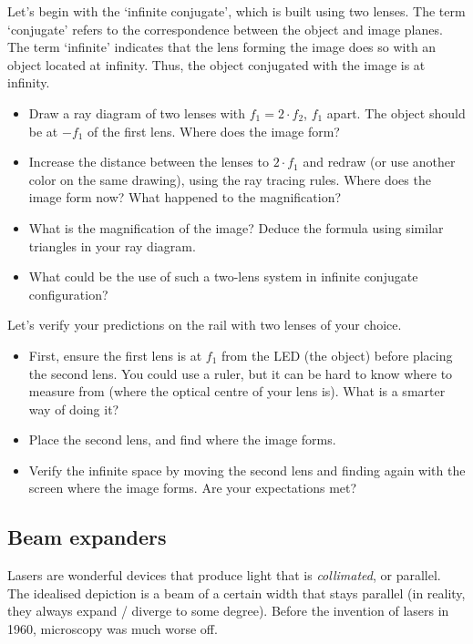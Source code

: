 \documentclass[a4paper]{report}
\begin{document}
	Let's begin with the `infinite conjugate', which is built using two lenses.
	The term `conjugate' refers to the correspondence between the object and image planes.
	The term `infinite' indicates that the lens forming the image does so with an object located at infinity.
	Thus, the object conjugated with the image is at infinity.

	\begin{itemize}
		\item Draw a ray diagram of two lenses with $f_1=2 \cdot f_2$, $f_1$ apart. The object should be at $-f_1$ of the first lens. Where does the image form?
		\item Increase the distance between the lenses to $2\cdot f_1$ and redraw (or use another color on the same drawing), using the ray tracing rules. Where does the image form now? What happened to the magnification?
		\item What is the magnification of the image? Deduce the formula using similar triangles in your ray diagram.
		\item What could be the use of such a two-lens system in infinite conjugate configuration?
	\end{itemize}

    \noindent
	Let's verify your predictions on the rail with two lenses of your choice.

	\begin{itemize}
	    \item First, ensure the first lens is at $f_1$ from the LED (the object) before placing the second lens. You could use a ruler, but it can be hard to know where to measure from (where the optical centre of your lens is). What is a smarter way of doing it?
	    \item Place the second lens, and find where the image forms.
	    \item Verify the infinite space by moving the second lens and finding again with the screen where the image forms. Are your expectations met?
	\end{itemize}




	\subsection{Beam expanders}
	\hypertarget{hintBack-expand}{}

	Lasers are wonderful devices that produce light that is \emph{collimated}, or parallel. The idealised depiction is a beam of a certain width that stays parallel (in reality, they always expand / diverge to some degree). Before the invention of lasers in 1960, microscopy was much worse off.
\end{document}
